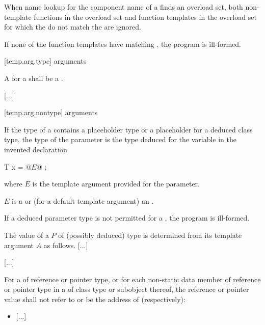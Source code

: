 \documentclass{wg21}
\begin{document}
\pnum
When name lookup for the component name of a
finds an overload set, both non-template functions in the overload
set and function templates in the overload set for
which the
do not match the
are ignored.
\begin{note}
If none of the function templates have matching
,
the program is ill-formed.
\end{note}

[temp.arg.type]{ arguments}

\pnum
A
for a
shall be a
.

\textcolor{noteclr}{[...]}

[temp.arg.nontype]{ arguments}

\pnum
If the type  of a 
contains a placeholder type
or a placeholder for a deduced class type,
the type of the parameter is the type deduced
for the variable  in the invented declaration
\begin{codeblock}
T x = @$E$@ ;
\end{codeblock}
where $E$ is the template argument provided for the parameter.
\begin{note}
$E$ is a  or
(for a default template argument) an .
\end{note}
If a deduced parameter type is not permitted
for a ,
the program is ill-formed.

\pnum
The value of a  $P$
of (possibly deduced) type 
is determined from its template argument $A$ as follows.
\textcolor{noteclr}{[...]}

\textcolor{noteclr}{[...]}

\pnum
For a  of reference or pointer type,
or for each non-static data member of reference or pointer type
in a  of class type or subobject thereof,
the reference or pointer value shall not refer to
or be the address of (respectively):
\begin{itemize}
    \item \textcolor{noteclr}{[...]}
\end{itemize}
\end{document}
